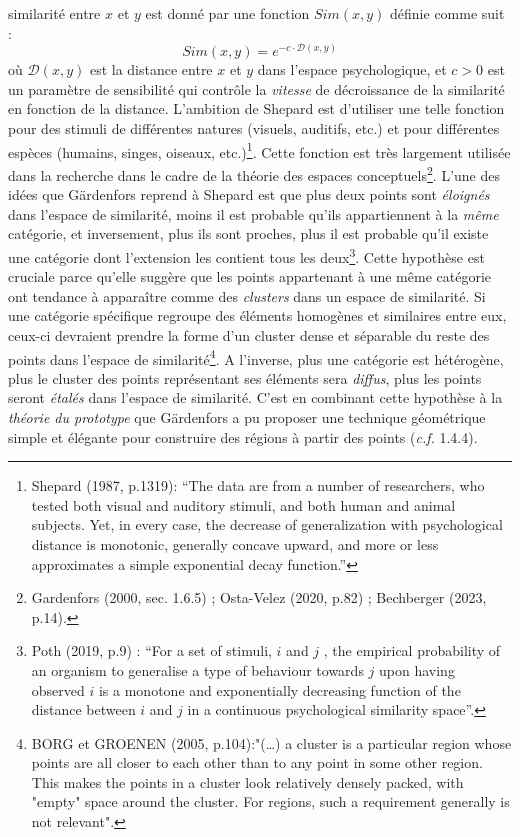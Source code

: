 \documentclass{article}
\begin{document}
similarité entre $x$ et $y$ est donné par une fonction $Sim(x,y)$ définie comme suit :
\[
{Sim}(x,y) = e^{-c \cdot \mathcal{D}(x,y)}
\]
où $\mathcal{D}(x,y)$ est la distance entre $x$ et $y$ dans l’espace psychologique, et $c>0$ est un paramètre de sensibilité qui contrôle la \textit{vitesse} de décroissance de la similarité en fonction de la distance. L’ambition de Shepard est d’utiliser une telle fonction pour des stimuli de différentes natures (visuels, auditifs, etc.) et pour différentes espèces (humains, singes, oiseaux, etc.)\footnote{Shepard (1987, p.1319): “The data are from a number of researchers, who tested both visual and auditory stimuli, and both human and animal subjects. Yet, in every case, the decrease of generalization with psychological distance is monotonic, generally concave upward, and more or less approximates a simple exponential decay function.”}. Cette fonction est très largement utilisée dans la recherche dans le cadre de la théorie des espaces conceptuels\footnote{Gardenfors (2000, sec. 1.6.5) ; Osta-Velez (2020, p.82) ; Bechberger (2023, p.14).}. L’une des idées que Gärdenfors reprend à Shepard est que plus deux points sont \textit{éloignés} dans l’espace de similarité, moins il est probable qu’ils appartiennent à la \textit{même} catégorie, et inversement, plus ils sont proches, plus il est probable qu’il existe une catégorie dont l’extension les contient tous les deux\footnote{Poth (2019, p.9) : “For a set of stimuli, $i$ and $j$ , the empirical probability of an organism to generalise a type of behaviour towards $j$ upon having observed $i$ is a monotone and exponentially decreasing function of the distance between $i$ and $j$ in a continuous psychological similarity space”.}. Cette hypothèse est cruciale parce qu’elle suggère que les points appartenant à une même catégorie ont tendance à apparaître comme des  \textit{clusters} dans un espace de similarité. Si une catégorie spécifique regroupe des éléments homogènes et similaires entre eux, ceux-ci devraient prendre la forme d’un cluster dense et séparable du reste des points dans l’espace de similarité\footnote{BORG et GROENEN (2005, p.104):"(…) a cluster is a particular region whose points are all closer to each other than to any point in some other region. This makes the points in a cluster look relatively densely packed, with "empty" space around the cluster. For regions, such a requirement generally is not relevant".}. A l’inverse, plus une catégorie est hétérogène, plus le cluster des points représentant ses éléments sera \textit{diffus}, plus les points seront \textit{étalés} dans l’espace de similarité. C’est en combinant cette hypothèse à la \textit{théorie du prototype} que Gärdenfors a pu proposer une technique géométrique simple et élégante pour construire des régions à partir des points (\textit{c.f.} 1.4.4).
\end{document}
